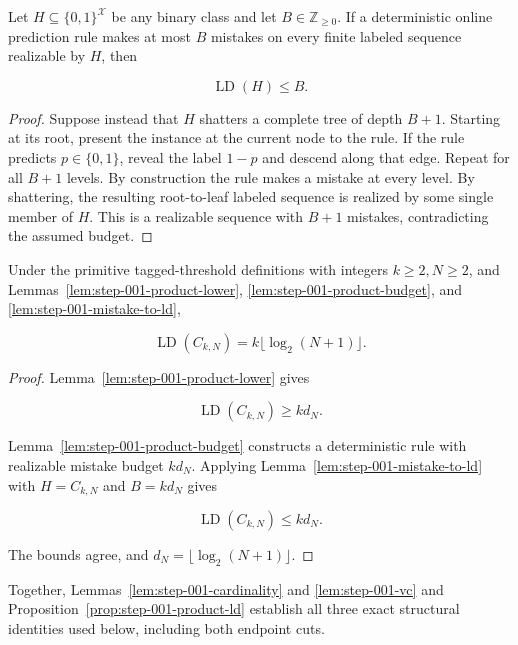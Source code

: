 \begin{lemma}\label{lem:step-001-mistake-to-ld}
Let \(H\subseteq\{0,1\}^{\mathcal X}\) be any binary class and let \(B\in\mathbb Z_{\ge0}\). If a deterministic online prediction rule makes at most \(B\) mistakes on every finite labeled sequence realizable by \(H\), then

\[
\operatorname{LD}(H)\le B.
\]
\end{lemma}

\begin{proof}
Suppose instead that \(H\) shatters a complete tree of depth \(B+1\). Starting at its root, present the instance at the current node to the rule. If the rule predicts \(p\in\{0,1\}\), reveal the label \(1-p\) and descend along that edge. Repeat for all \(B+1\) levels. By construction the rule makes a mistake at every level. By shattering, the resulting root-to-leaf labeled sequence is realized by some single member of \(H\). This is a realizable sequence with \(B+1\) mistakes, contradicting the assumed budget. \end{proof}

\begin{proposition}\label{prop:step-001-product-ld}
Under the primitive tagged-threshold definitions with integers \(k\ge2,N\ge2\), and Lemmas~\ref{lem:step-001-product-lower}, \ref{lem:step-001-product-budget}, and \ref{lem:step-001-mistake-to-ld},

\[
\operatorname{LD}(C_{k,N})
=k\lfloor\log_2(N+1)\rfloor.
\]
\end{proposition}

\begin{proof}
Lemma~\ref{lem:step-001-product-lower} gives

\[
\operatorname{LD}(C_{k,N})\ge kd_N.
\]

Lemma~\ref{lem:step-001-product-budget} constructs a deterministic rule with realizable mistake budget \(kd_N\). Applying Lemma~\ref{lem:step-001-mistake-to-ld} with \(H=C_{k,N}\) and \(B=kd_N\) gives

\[
\operatorname{LD}(C_{k,N})\le kd_N.
\]

The bounds agree, and \(d_N=\lfloor\log_2(N+1)\rfloor\). \end{proof}

Together, Lemmas~\ref{lem:step-001-cardinality} and
\ref{lem:step-001-vc} and
Proposition~\ref{prop:step-001-product-ld} establish all three exact
structural identities used below, including both endpoint cuts.

